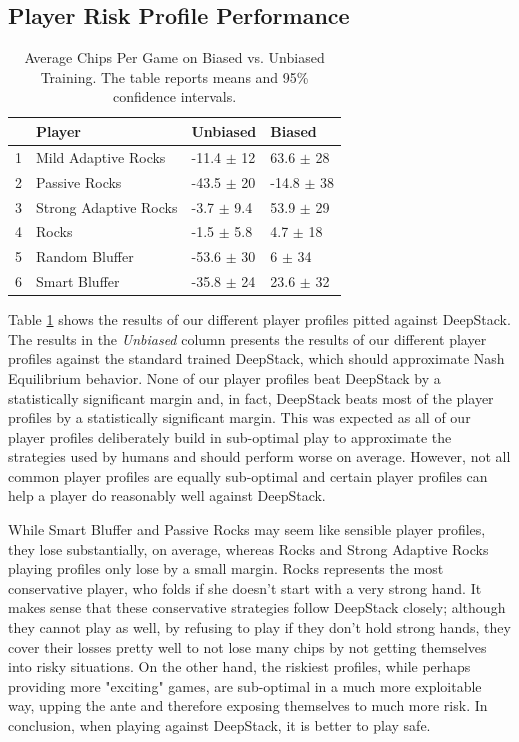 \documentclass{article}
\begin{document}
\subsection{Player Risk Profile Performance}
\begin{table}
\centering
\begin{tabular}{rlll}
  \hline
 & Player & Unbiased & Biased \\ 
  \hline
  1 & Mild Adaptive Rocks & -11.4 $\pm$ 12 & 63.6 $\pm$ 28 \\ 
  2 & Passive Rocks & -43.5 $\pm$ 20 & -14.8 $\pm$ 38 \\ 
  3 & Strong Adaptive Rocks & -3.7 $\pm$ 9.4 & 53.9 $\pm$ 29 \\ 
  4 & Rocks & -1.5 $\pm$ 5.8 & 4.7 $\pm$ 18 \\ 
  5 & Random Bluffer & -53.6 $\pm$ 30 & 6 $\pm$ 34 \\ 
  6 & Smart Bluffer & -35.8 $\pm$ 24 & 23.6 $\pm$ 32 \\ 
   \hline
\end{tabular}
\caption{Average Chips Per Game on Biased vs. Unbiased Training. The table reports means and 95\% confidence intervals.}
\label{perf_results}
\end{table}

\indent Table \ref{perf_results} shows the results of our different player profiles pitted against DeepStack. %
The results in the \textit{Unbiased} column presents the results of our different player profiles against the standard trained DeepStack, which should approximate Nash Equilibrium behavior. None of our player profiles beat DeepStack by a statistically significant margin and, in fact, DeepStack beats most of the player profiles by a statistically significant margin. This was expected as all of our player profiles deliberately build in sub-optimal play to approximate the strategies used by humans and should perform worse on average. However, not all common player profiles are equally sub-optimal and certain player profiles can help a player do reasonably well against DeepStack. 

\indent While Smart Bluffer and Passive Rocks may seem like sensible player profiles, they lose substantially, on average, whereas Rocks and Strong Adaptive Rocks playing profiles only lose by a small margin. Rocks represents the most conservative player, who folds if she doesn't start with a very strong hand. It makes sense that these conservative strategies follow DeepStack closely; although they cannot play as well, by refusing to play if they don't hold strong hands, they cover their losses pretty well to not lose many chips by not getting themselves into risky situations. On the other hand, the riskiest profiles, while perhaps providing more "exciting" games, are sub-optimal in a much more exploitable way, upping the ante and therefore exposing themselves to much more risk. In conclusion, when playing against DeepStack, it is better to play safe. %
\end{document}
